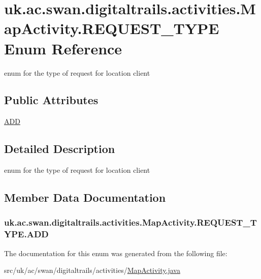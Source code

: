 \hypertarget{enumuk_1_1ac_1_1swan_1_1digitaltrails_1_1activities_1_1_map_activity_1_1_r_e_q_u_e_s_t___t_y_p_e}{\section{uk.\+ac.\+swan.\+digitaltrails.\+activities.\+Map\+Activity.\+R\+E\+Q\+U\+E\+S\+T\+\_\+\+T\+Y\+P\+E Enum Reference}
\label{enumuk_1_1ac_1_1swan_1_1digitaltrails_1_1activities_1_1_map_activity_1_1_r_e_q_u_e_s_t___t_y_p_e}
}


enum for the type of request for location client  


\subsection*{Public Attributes}
\begin{DoxyCompactItemize}
\item 
\hyperlink{enumuk_1_1ac_1_1swan_1_1digitaltrails_1_1activities_1_1_map_activity_1_1_r_e_q_u_e_s_t___t_y_p_e_aa29be13c973a663e296ea42a862b9659}{A\+D\+D}
\end{DoxyCompactItemize}


\subsection{Detailed Description}
enum for the type of request for location client 

\subsection{Member Data Documentation}
\hypertarget{enumuk_1_1ac_1_1swan_1_1digitaltrails_1_1activities_1_1_map_activity_1_1_r_e_q_u_e_s_t___t_y_p_e_aa29be13c973a663e296ea42a862b9659}{
\subsubsection[{A\+D\+D}]{\setlength{\rightskip}{0pt plus 5cm}uk.\+ac.\+swan.\+digitaltrails.\+activities.\+Map\+Activity.\+R\+E\+Q\+U\+E\+S\+T\+\_\+\+T\+Y\+P\+E.\+A\+D\+D}}\label{enumuk_1_1ac_1_1swan_1_1digitaltrails_1_1activities_1_1_map_activity_1_1_r_e_q_u_e_s_t___t_y_p_e_aa29be13c973a663e296ea42a862b9659}


The documentation for this enum was generated from the following file\+:\begin{DoxyCompactItemize}
\item 
src/uk/ac/swan/digitaltrails/activities/\hyperlink{_map_activity_8java}{Map\+Activity.\+java}\end{DoxyCompactItemize}
